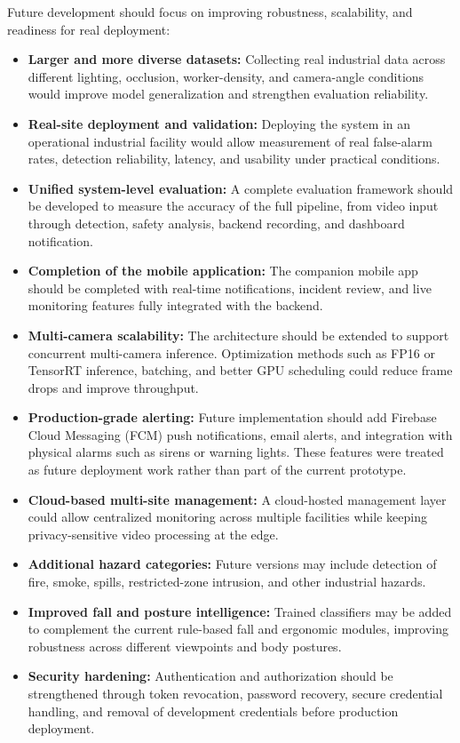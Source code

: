 Future development should focus on improving robustness, scalability, and readiness for real deployment:

\begin{itemize}
\item \textbf{Larger and more diverse datasets:} Collecting real industrial data across different lighting, occlusion, worker-density, and camera-angle conditions would improve model generalization and strengthen evaluation reliability.

\item \textbf{Real-site deployment and validation:} Deploying the system in an operational industrial facility would allow measurement of real false-alarm rates, detection reliability, latency, and usability under practical conditions.

\item \textbf{Unified system-level evaluation:} A complete evaluation framework should be developed to measure the accuracy of the full pipeline, from video input through detection, safety analysis, backend recording, and dashboard notification.

\item \textbf{Completion of the mobile application:} The companion mobile app should be completed with real-time notifications, incident review, and live monitoring features fully integrated with the backend.

\item \textbf{Multi-camera scalability:} The architecture should be extended to support concurrent multi-camera inference. Optimization methods such as FP16 or TensorRT inference, batching, and better GPU scheduling could reduce frame drops and improve throughput.

\item \textbf{Production-grade alerting:} Future implementation should add Firebase Cloud Messaging (FCM) push notifications, email alerts, and integration with physical alarms such as sirens or warning lights. These features were treated as future deployment work rather than part of the current prototype.

\item \textbf{Cloud-based multi-site management:} A cloud-hosted management layer could allow centralized monitoring across multiple facilities while keeping privacy-sensitive video processing at the edge.

\item \textbf{Additional hazard categories:} Future versions may include detection of fire, smoke, spills, restricted-zone intrusion, and other industrial hazards.

\item \textbf{Improved fall and posture intelligence:} Trained classifiers may be added to complement the current rule-based fall and ergonomic modules, improving robustness across different viewpoints and body postures.

\item \textbf{Security hardening:} Authentication and authorization should be strengthened through token revocation, password recovery, secure credential handling, and removal of development credentials before production deployment.
\end{itemize}
